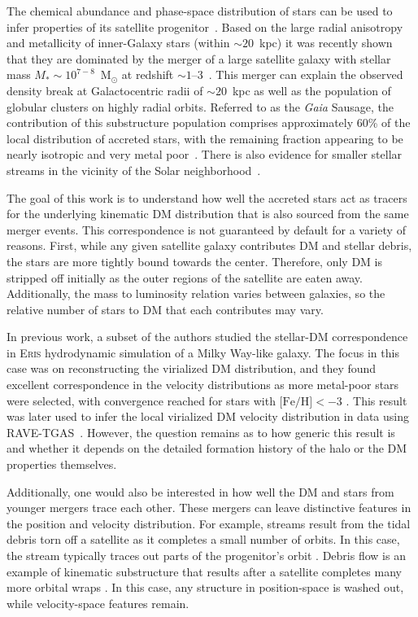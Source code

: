 \documentclass[twocolumn,preprintnumbers]{aastex6}
\newcommand{\FeH}{\text{[Fe/H]} }
\begin{document}
The chemical abundance and phase-space distribution of stars can be used to infer properties of its satellite progenitor~\citep{Helmi:2002iu, 2005ApJ...635..931B, Robertson:2005gv, Font:2005qs, DeLucia:2008gk, 2016ApJ...821....5D}.  Based on the large radial anisotropy and metallicity of inner-Galaxy stars (within $\sim20$~kpc) it was recently shown that they are dominated by the merger of a large satellite galaxy with stellar mass $M_* \sim 10^{7-8}$~M$_\odot$ at redshift $\sim 1$--3~\citep{2018arXiv180203414B}.  This merger can explain the observed density break at Galactocentric radii of $\sim 20$~kpc as well as the population of globular clusters on highly radial orbits.  Referred to as the \emph{Gaia} Sausage, the contribution of this substructure population comprises approximately 60\% of the local distribution of accreted stars, with the remaining fraction appearing to be nearly isotropic and very metal poor~\citep{necib2018}.  There is also evidence for smaller stellar streams in the vicinity of the Solar neighborhood~\citep{Myeong:2017skt}.

The goal of this work is to understand how well the accreted stars act as tracers for the underlying kinematic DM distribution that is also sourced from the same merger events.  This correspondence is not guaranteed by default for a variety of reasons.  First, while any given satellite galaxy contributes DM and stellar debris, the stars are more tightly bound towards the center.  Therefore, only DM is stripped off initially as the outer regions of the satellite are eaten away.  Additionally, the mass to luminosity relation varies between galaxies, so the relative number of stars to DM that each contributes may vary.  

In previous work, a subset of the authors studied the stellar-DM correspondence in \textsc{Eris} hydrodynamic simulation of a Milky Way-like galaxy.  The focus in this case was on reconstructing the virialized DM distribution, and they found excellent correspondence in the velocity distributions as more metal-poor stars were selected, with convergence reached for stars with $\FeH < -3$ \citep{Herzog-Arbeitman:2017fte}.  This result was later used to infer the local virialized DM velocity distribution in data using RAVE-TGAS~\citep{Herzog-Arbeitman:2017zbm}. However, the question remains as to how generic this result is and whether it depends on the detailed formation history of the halo or the DM properties themselves. 

Additionally, one would also be interested in how well the DM and stars from younger mergers trace each other.  These mergers can leave distinctive features in the position and velocity distribution.  For example, streams result from the tidal debris torn off a satellite as it completes a small number of orbits.  In this case, the stream typically traces out parts of the progenitor's orbit \citep{2012JCAP...08..027P}.  Debris flow is an example of kinematic substructure that results after a satellite completes many more  orbital wraps \citep{Lisanti:2011as,Kuhlen:2012fz}.  In this case, any structure in position-space is washed out, while velocity-space features remain.  
\end{document}
